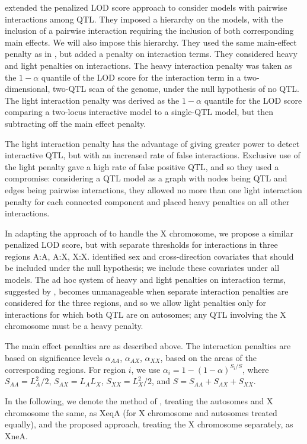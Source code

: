 \documentclass[12pt,letterpaper]{article}
\begin{document}
\citet{Manichaikul2009} extended the penalized LOD score approach to
consider models with pairwise interactions among QTL. They imposed a
hierarchy on the models, with the inclusion of a pairwise interaction
requiring the inclusion of both corresponding main effects. We will
also impose this hierarchy. They used the same main-effect penalty as
in \citet{Broman2002}, but added a penalty on interaction terms. They
considered heavy and light penalties on interactions. The heavy
interaction penalty was taken as the $1-\alpha$ quantile of the LOD
score for the interaction term in a two-dimensional, two-QTL scan of
the genome, under the null hypothesis of no QTL. The light interaction
penalty was derived as the $1-\alpha$ quantile for the LOD score
comparing a two-locus interactive model to a single-QTL model, but
then subtracting off the main effect penalty.

The light interaction penalty has the advantage of giving greater
power to detect interactive QTL, but with an increased rate of false
interactions. Exclusive use of the light penalty gave a high rate of
false positive QTL, and so they used a compromise: considering a QTL
model as a graph with nodes being QTL and edges being pairwise
interactions, they allowed no more than one light interaction penalty
for each connected component and placed heavy penalties on all other
interactions.

In adapting the approach of \citet{Manichaikul2009} to handle the X
chromosome, we propose a similar penalized LOD score, but with
separate thresholds for interactions in three regions A:A, A:X,
X:X. \citet{Broman2006} identified sex and cross-direction
covariates that should be included under the null hypothesis; we
include these covariates under all models. The ad hoc system of heavy and
light penalties on interaction terms, suggested by
\citet{Manichaikul2009}, becomes unmanageable when separate
interaction penalties are considered for the three regions, and so we
allow light penalties only for interactions for which both QTL are on
autosomes; any QTL involving the X chromosome must be a heavy penalty.

The main effect penalties are as described above. The interaction
penalties are based on significance levels $\alpha_{AA}$,
$\alpha_{AX}$, $\alpha_{XX}$, based on the areas of the corresponding
regions. For region $i$, we use $\alpha_i = 1 - (1-\alpha)^{S_i/S}$,
where $S_{AA} = L_A^2/2$, $S_{AX} = L_AL_X$, $S_{XX} = L_X^2/2$, and
$S = S_{AA} + S_{AX} + S_{XX}$.

In the following, we denote the method of \citet{Manichaikul2009},
treating the autosomes and X chromosome the same, as XeqA (for X
chromosome and autosomes treated equally), and the proposed approach,
treating the X chromosome separately, as XneA.
\end{document}
